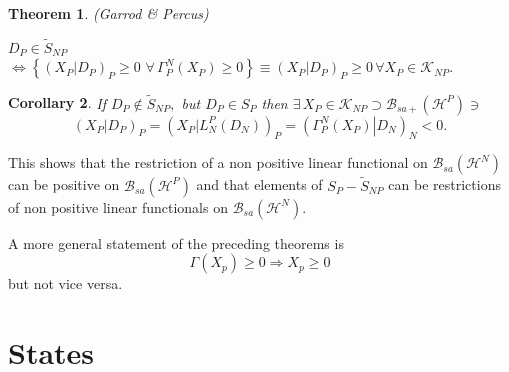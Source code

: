 \documentclass[aps,preprint]{revtex4}%
\newtheorem{theorem}{Theorem}
\newtheorem{corollary}[theorem]{Corollary}
\begin{document}
\begin{theorem}
(Garrod \& Percus)
\end{theorem}

$D_{P}\in\tilde{S}_{NP}$ $\Longleftrightarrow\left\{  \left(  \left.
X_{P}\right\vert D_{P}\right)  _{P}\geq0\,\,\forall\,\Gamma_{P}^{N}\left(
X_{P}\right)  \geq0\right\}  \equiv\left(  \left.  X_{P}\right\vert
D_{P}\right)  _{P}\geq0\,\forall X_{P}\in\mathcal{K}_{NP}.$

\begin{corollary}
If $D_{P}\notin\tilde{S}_{NP},$ but $D_{P}\in S_{P}$ then $\exists\,X_{P}%
\in\mathcal{K}_{NP}\supset\mathcal{B}_{sa+}\left(  \mathcal{H}^{P}\right)
\ni$
\begin{equation}
\left(  \left.  X_{P}\right\vert D_{P}\right)  _{P}=\left(  \left.
X_{P}\right\vert L_{N}^{P}\left(  D_{N}\right)  \right)  _{P}=\left(  \left.
\Gamma_{P}^{N}\left(  X_{P}\right)  \right\vert D_{N}\right)  _{N}<0.
\end{equation}

\end{corollary}

This shows that the restriction of a non positive linear functional on
$\mathcal{B}_{sa}\left(  \mathcal{H}^{N}\right)  $ can be positive on
$\mathcal{B}_{sa}\left(  \mathcal{H}^{P}\right)  $ and that elements of
$S_{P}-\tilde{S}_{NP}$ can be restrictions of non positive linear functionals
on $\mathcal{B}_{sa}\left(  \mathcal{H}^{N}\right)  .$

A more general statement of the preceding theorems is
\begin{equation}
\Gamma\left(  X_{p}\right)  \geq0\Rightarrow X_{p}\geq0
\end{equation}
but not vice versa.

\section{States}
\end{document}
